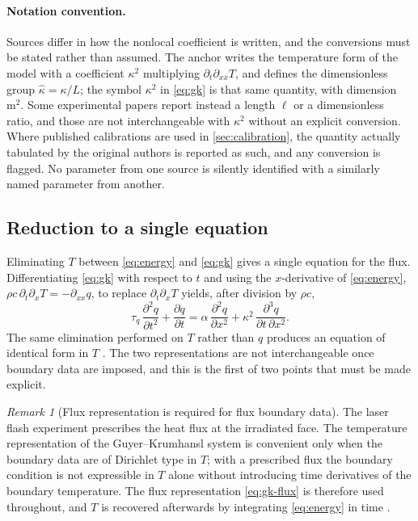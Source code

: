 \documentclass[preprint,12pt,a4paper]{elsarticle}
\theoremstyle{plain}
\theoremstyle{definition}
\theoremstyle{remark}
\newtheorem{remark}{Remark}
\newcommand{\tq}{\tau_{q}}
\newcommand{\kk}{\kappa^{2}}
\begin{document}
\paragraph{Notation convention.}
Sources differ in how the nonlocal coefficient is written, and the conversions
must be stated rather than assumed. The anchor \cite{Kovacs2018} writes the
temperature form of the model with a coefficient $\kappa^{2}$ multiplying
$\partial_{t}\partial_{xx}T$, and defines the dimensionless group
$\hat{\kappa} = \kappa/L$; the symbol $\kk$ in \eqref{eq:gk} is that same
quantity, with dimension $\si{\metre\squared}$. Some experimental papers report
instead a length $\ell$ or a dimensionless ratio, and those are not
interchangeable with $\kk$ without an explicit conversion. Where published
calibrations are used in \cref{sec:calibration}, the quantity actually
tabulated by the original authors is reported as such, and any conversion is
flagged. No parameter from one source is silently identified with a
similarly named parameter from another.

\subsection{Reduction to a single equation}
\label{sec:model-reduction}

Eliminating $T$ between \eqref{eq:energy} and \eqref{eq:gk} gives a single
equation for the flux. Differentiating \eqref{eq:gk} with respect to $t$
and using the $x$-derivative of \eqref{eq:energy},
$\rho c\,\partial_{t}\partial_{x} T = -\partial_{xx} q$, to replace
$\partial_{t}\partial_{x}T$ yields, after division by $\rho c$,%
\begin{equation}
  \tq \, \frac{\partial^{2} q}{\partial t^{2}}
  + \frac{\partial q}{\partial t}
  = \alpha \, \frac{\partial^{2} q}{\partial x^{2}}
  + \kk \, \frac{\partial^{3} q}{\partial t \, \partial x^{2}} .
  \label{eq:gk-flux}
\end{equation}
%
The same elimination performed on $T$ rather than $q$ produces an equation of
identical form in $T$ \cite{Kovacs2018}. The two representations are not
interchangeable once boundary data are imposed, and this is the first of two
points that must be made explicit.

\begin{remark}[Flux representation is required for flux boundary data]
\label{rem:qrep}
The laser flash experiment prescribes the heat flux at the irradiated face.
The temperature representation of the Guyer--Krumhansl system is convenient
only when the boundary data are of Dirichlet type in $T$; with a prescribed
flux the boundary condition is not expressible in $T$ alone without
introducing time derivatives of the boundary temperature. The flux
representation \eqref{eq:gk-flux} is therefore used throughout, and $T$ is
recovered afterwards by integrating \eqref{eq:energy} in time
\cite{Kovacs2018,KovacsVan2015}.
\end{remark}
\end{document}
